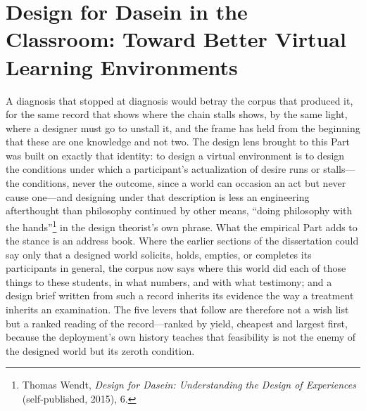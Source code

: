 
\section{Design for Dasein in the Classroom: Toward Better Virtual Learning Environments}

A diagnosis that stopped at diagnosis would betray the corpus that produced it, for the same record that shows where the chain stalls shows, by the same light, where a designer must go to unstall it, and the frame has held from the beginning that these are one knowledge and not two. The design lens brought to this Part was built on exactly that identity: to design a virtual environment is to design the conditions under which a participant's actualization of desire runs or stalls---the conditions, never the outcome, since a world can occasion an act but never cause one---and designing under that description is less an engineering afterthought than philosophy continued by other means, ``doing philosophy with the hands''\footnote{Thomas Wendt, \textit{Design for Dasein: Understanding the Design of Experiences} (self-published, 2015), 6.} in the design theorist's own phrase. What the empirical Part adds to the stance is an address book. Where the earlier sections of the dissertation could say only that a designed world solicits, holds, empties, or completes its participants in general, the corpus now says where this world did each of those things to these students, in what numbers, and with what testimony; and a design brief written from such a record inherits its evidence the way a treatment inherits an examination. The five levers that follow are therefore not a wish list but a ranked reading of the record---ranked by yield, cheapest and largest first, because the deployment's own history teaches that feasibility is not the enemy of the designed world but its zeroth condition.

